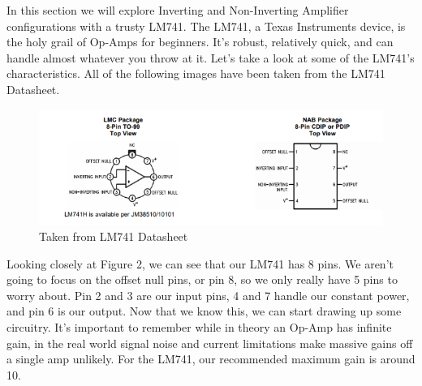 \documentclass[letterpaper,12pt]{article}
\begin{document}
In this section we will explore Inverting and Non-Inverting Amplifier configurations with a trusty LM741. The LM741, a Texas Instruments device, is the holy grail of Op-Amps for beginners. It's robust, relatively quick, and can handle almost whatever you throw at it. Let's take a look at some of the LM741's characteristics. All of the following images have been taken from the LM741 Datasheet.
\begin{figure}
    \centering
    \includegraphics[width=150mm,scale=1]{op-amp.PNG}
    \caption{Taken from LM741 Datasheet}
\end{figure}
Looking closely at Figure 2, we can see that our LM741 has 8 pins. We aren't going to focus on the offset null pins, or pin 8, so we only really have 5 pins to worry about. Pin 2 and 3 are our input pins, 4 and 7 handle our constant power, and pin 6 is our output. Now that we know this, we can start drawing up some circuitry. It's important to remember while in theory an Op-Amp has infinite gain, in the real world signal noise and current limitations make massive gains off a single amp unlikely. For the LM741, our recommended maximum gain is around 10.
\end{document}

